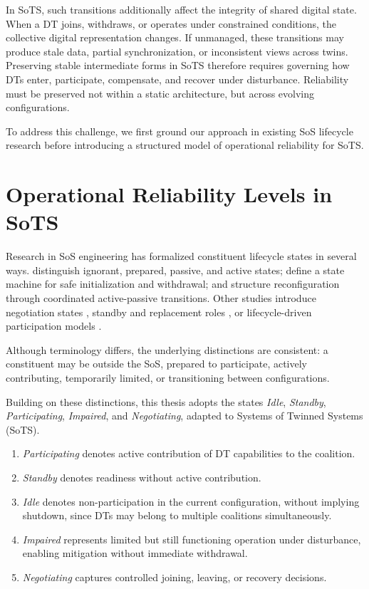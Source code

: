 In SoTS, such transitions additionally affect the integrity of shared digital state. When a DT joins, withdraws, or operates under constrained conditions, the collective digital representation changes. If unmanaged, these transitions may produce stale data, partial synchronization, or inconsistent views across twins. Preserving stable intermediate forms in SoTS therefore requires governing how DTs enter, participate, compensate, and recover under disturbance. Reliability must be preserved not within a static architecture, but across evolving configurations.

To address this challenge, we first ground our approach in existing SoS lifecycle research before introducing a structured model of operational reliability for SoTS.

\section{Operational Reliability Levels in SoTS}

Research in SoS engineering has formalized constituent lifecycle states in several ways. \citet{axelsson2019refined} distinguish ignorant, prepared, passive, and active states; \citet{hristozov2023modeling} define a state machine for safe initialization and withdrawal; and \citet{petitdemange2021design} structure reconfiguration through coordinated active-passive transitions. Other studies introduce negotiation states \cite{qin2016contract}, standby and replacement roles \cite{du2024reconfiguration}, or lifecycle-driven participation models \cite{svenson2020situation}.

Although terminology differs, the underlying distinctions are consistent: a constituent may be outside the SoS, prepared to participate, actively contributing, temporarily limited, or transitioning between configurations.

Building on these distinctions, this thesis adopts the states \emph{Idle}, \emph{Standby}, \emph{Participating}, \emph{Impaired}, and \emph{Negotiating}, adapted to Systems of Twinned Systems (SoTS).

\begin{enumerate}
    \item \emph{Participating} denotes active contribution of DT capabilities to the coalition.
    \item \emph{Standby} denotes readiness without active contribution.
    \item \emph{Idle} denotes non-participation in the current configuration, without implying shutdown, since DTs may belong to multiple coalitions simultaneously.
    \item \emph{Impaired} represents limited but still functioning operation under disturbance, enabling mitigation without immediate withdrawal.
    \item \emph{Negotiating} captures controlled joining, leaving, or recovery decisions.
\end{enumerate}

